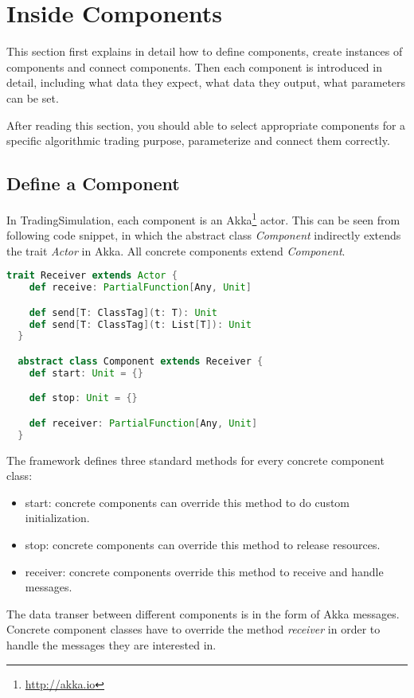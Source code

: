 \section{Inside Components}
\label{sec:2}

This section first explains in detail how to define components, create instances of components and connect components. Then each component is introduced in detail, including what data they expect, what data they output, what parameters can be set.

After reading this section, you should able to select appropriate components for a specific algorithmic trading purpose, parameterize and connect them correctly.

\subsection{Define a Component}

In TradingSimulation, each component is an Akka\footnote{\url{http://akka.io}} actor. This can be seen from following code snippet, in which the abstract class \emph{Component} indirectly extends the trait \emph{Actor} in Akka. All concrete components extend \emph{Component}.

\begin{lstlisting}[language=Scala]
  trait Receiver extends Actor {
    def receive: PartialFunction[Any, Unit]

    def send[T: ClassTag](t: T): Unit
    def send[T: ClassTag](t: List[T]): Unit
  }

  abstract class Component extends Receiver {
    def start: Unit = {}

    def stop: Unit = {}

    def receiver: PartialFunction[Any, Unit]
  }
\end{lstlisting}

The framework defines three standard methods for every concrete component class:

\begin{itemize}
\item{start}: concrete components can override this method to do custom initialization.
\item{stop}: concrete components can override this method to release resources.
\item{receiver}: concrete components override this method to receive and handle messages.
\end{itemize}

The data transer between different components is in the form of Akka messages. Concrete component classes have to override the method \emph{receiver} in order to handle the messages they are interested in.

